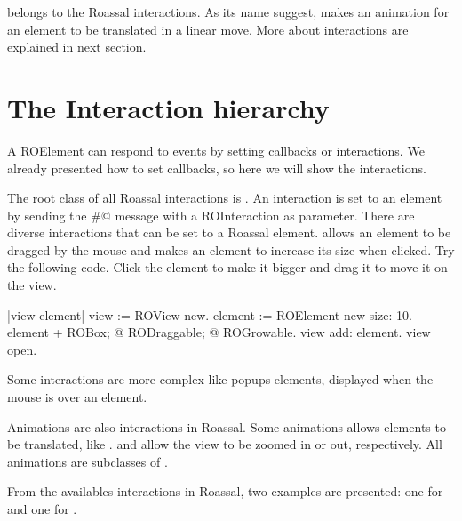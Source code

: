 \documentclass[a4paper,10pt,twoside]{book}
\begin{document}
 belongs to the Roassal interactions. As its name suggest, makes an animation for an element to be translated in a linear move. More about interactions are explained in next section.

%


\section{The Interaction hierarchy} 

A ROElement can respond to events by setting callbacks or interactions. We already presented how to set callbacks, so here we will show the interactions. 

The root class of all Roassal interactions is . An interaction is set to an element by sending the \#@ message with a ROInteraction as parameter.
There are diverse interactions that can be set to a Roassal element.
  allows an element to be dragged by the mouse and  makes an element to increase its size when clicked. Try the following code. Click the element to make it bigger and drag it to move it on the view.

\begin{code}{}
|view element|
view := ROView new.
element := ROElement new size: 10.
element 
	+ ROBox;
	@ RODraggable; 
	@ ROGrowable.
view add: element.
view open.
\end{code}


Some interactions are more complex like popups elements, displayed when the mouse is over an element. 





Animations are also interactions in Roassal. Some animations allows elements to be translated, like .  and  allow the view to be zoomed in or out, respectively. All animations are subclasses of .

From the availables interactions in Roassal, two examples are presented: one for  and one for .
\end{document}
